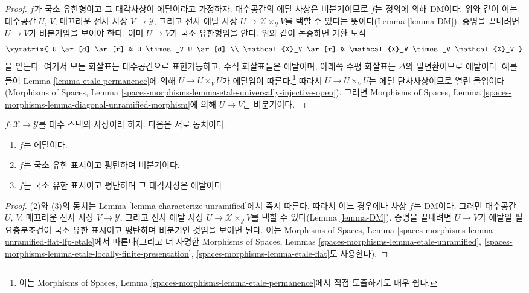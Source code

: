 \begin{proof}
\medskip\noindent
$f$가 국소 유한형이고 그 대각사상이 에탈이라고 가정하자. 대수공간의
에탈 사상은 비분기이므로 $f$는 정의에 의해 DM이다. 위와 같이 이는
대수공간 $U$, $V$, 매끄러운 전사 사상 $V \to \mathcal{Y}$, 그리고
전사 에탈 사상 $U \to \mathcal{X} \times_\mathcal{Y} V$를 택할 수
있다는 뜻이다(Lemma \ref{lemma-DM}). 증명을 끝내려면 $U \to V$가
비분기임을 보여야 한다. 이미 $U \to V$가 국소 유한형임을 안다. 위와
같이 논증하면 가환 도식
$$
\xymatrix{
U \ar[d] \ar[r] & U \times_V U \ar[d] \\
\mathcal{X}_V \ar[r] & \mathcal{X}_V \times_V \mathcal{X}_V
}
$$
을 얻는다. 여기서 모든 화살표는 대수공간으로 표현가능하고, 수직
화살표들은 에탈이며, 아래쪽 수평 화살표는 $\Delta$의 밑변환이므로
에탈이다. 예를 들어 Lemma \ref{lemma-etale-permanence}에 의해
$U \to U \times_V U$가 에탈임이 따른다.\footnote{이는 Morphisms of
Spaces, Lemma \ref{spaces-morphisms-lemma-etale-permanence}에서 직접
도출하기도 매우 쉽다.} 따라서 $U \to U \times_V U$는 에탈 단사사상이므로
열린 몰입이다(Morphisms of Spaces, Lemma
\ref{spaces-morphisms-lemma-etale-universally-injective-open}). 그러면
Morphisms of Spaces, Lemma
\ref{spaces-morphisms-lemma-diagonal-unramified-morphism}에 의해
$U \to V$는 비분기이다.
\end{proof}

\begin{lemma}
\label{lemma-characterize-etale}
$f : \mathcal{X} \to \mathcal{Y}$를 대수 스택의 사상이라 하자. 다음은
서로 동치이다.
\begin{enumerate}
\item $f$는 에탈이다.
\item $f$는 국소 유한 표시이고 평탄하며 비분기이다.
\item $f$는 국소 유한 표시이고 평탄하며 그 대각사상은 에탈이다.
\end{enumerate}
\end{lemma}

\begin{proof}
(2)와 (3)의 동치는 Lemma \ref{lemma-characterize-unramified}에서 즉시
따른다. 따라서 어느 경우에나 사상 $f$는 DM이다.
그러면 대수공간 $U$, $V$, 매끄러운 전사 사상
$V \to \mathcal{Y}$, 그리고 전사 에탈 사상
$U \to \mathcal{X} \times_\mathcal{Y} V$를 택할 수 있다(Lemma
\ref{lemma-DM}). 증명을 끝내려면 $U \to V$가 에탈일 필요충분조건이
국소 유한 표시이고 평탄하며 비분기인 것임을 보이면 된다. 이는 Morphisms
of Spaces, Lemma \ref{spaces-morphisms-lemma-unramified-flat-lfp-etale}에서
따른다(그리고 더 자명한 Morphisms of Spaces, Lemmas
\ref{spaces-morphisms-lemma-etale-unramified},
\ref{spaces-morphisms-lemma-etale-locally-finite-presentation},
\ref{spaces-morphisms-lemma-etale-flat}도 사용한다).
\end{proof}








